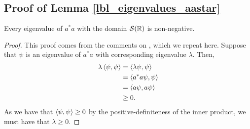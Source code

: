 \subsection{Proof of Lemma \eqref{lbl_eigenvalues_aastar}}\label{proof_lbl_eigenvalues_aastar}

\begin{lemma}
  Every eigenvalue of $a^*a$ with the domain $\mathcal{S}(\mathbb{R})$ is non-negative.
\end{lemma}
\begin{proof}
  This proof comes from the comments on {\cite[p.230]{Hall2013}}, which we repeat here. Suppose that $\psi$ is an eigenvalue of $a^*a$ with corresponding eigenvalue $\lambda$. Then,
  \begin{align*}
    \lambda \left\langle \psi, \psi\right\rangle
    &= \left\langle \lambda \psi, \psi\right\rangle \\
    &= \left\langle a^* a \psi, \psi\right\rangle \\
    &= \left\langle a \psi, a \psi\right\rangle \\
    &\geq 0.
  \end{align*}
  As we have that $\left\langle \psi, \psi\right\rangle \geq 0$ by the positive-definiteness of the inner product, we must have that $\lambda \geq 0$.
\end{proof}
